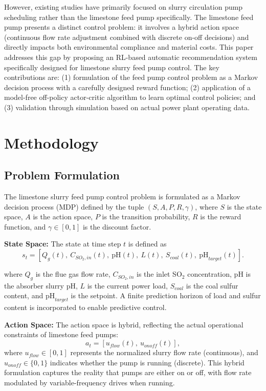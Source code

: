 \documentclass[journal]{IEEEtran}
\begin{document}
However, existing studies have primarily focused on slurry circulation pump scheduling rather than the limestone feed pump specifically. The limestone feed pump presents a distinct control problem: it involves a hybrid action space (continuous flow rate adjustment combined with discrete on-off decisions) and directly impacts both environmental compliance and material costs. This paper addresses this gap by proposing an RL-based automatic recommendation system specifically designed for limestone slurry feed pump control. The key contributions are: (1) formulation of the feed pump control problem as a Markov decision process with a carefully designed reward function; (2) application of a model-free off-policy actor-critic algorithm to learn optimal control policies; and (3) validation through simulation based on actual power plant operating data.


\section{Methodology}
\subsection{Problem Formulation}

The limestone slurry feed pump control problem is formulated as a Markov decision process (MDP) defined by the tuple $(S, A, P, R, \gamma)$, where $S$ is the state space, $A$ is the action space, $P$ is the transition probability, $R$ is the reward function, and $\gamma \in [0,1]$ is the discount factor.

\textbf{State Space:} The state at time step $t$ is defined as
\begin{equation}
s_t = [Q_g(t),\ C_{SO_2,in}(t),\ \text{pH}(t),\ L(t),\ S_{coal}(t),\ \text{pH}_{target}(t)].
\end{equation}

where $Q_g$ is the flue gas flow rate, $C_{SO_2,in}$ is the inlet SO$_2$ concentration, pH is the absorber slurry pH, $L$ is the current power load, $S_{coal}$ is the coal sulfur content, and $\text{pH}_{target}$ is the setpoint. A finite prediction horizon of load and sulfur content is incorporated to enable predictive control.

\textbf{Action Space:} The action space is hybrid, reflecting the actual operational constraints of limestone feed pumps:
\begin{equation}
a_t = [u_{flow}(t),\ u_{onoff}(t)],
\end{equation}
where $u_{flow} \in [0,1]$ represents the normalized slurry flow rate (continuous), and $u_{onoff} \in \{0,1\}$ indicates whether the pump is running (discrete). This hybrid formulation captures the reality that pumps are either on or off, with flow rate modulated by variable-frequency drives when running.
\end{document}

